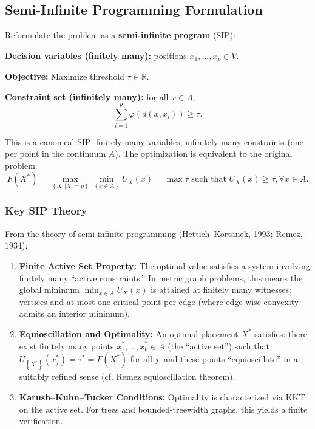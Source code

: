 \documentclass[
]{article}
\begin{document}
\subsection{Semi-Infinite Programming Formulation}

Reformulate the problem as a \textbf{semi-infinite program} (SIP):

\textbf{Decision variables (finitely many):} positions
\(x_{1},\ldots,x_{p} \in V\).

\textbf{Objective:} Maximize threshold \(\tau \in {\mathbb{R}}\).

\textbf{Constraint set (infinitely many):} for all \(x \in A\),
\[\sum_{i = 1}^{p}\varphi(d\left( x,x_{i} \right)) \geq \tau.\]

This is a canonical SIP: finitely many variables, infinitely many
constraints (one per point in the continuum \(A\)). The optimization is
equivalent to the original problem:
\[F\left( X^{*} \right) = \max_{\left\{ X,|X| = p \right\}}\min_{\left\{ x \in A \right\}}U_{X}(x) = \max\tau\text{ such that }U_{X}(x) \geq \tau,\forall x \in A.\]

\subsubsection{Key SIP Theory}

From the theory of semi-infinite programming (Hettich--Kortanek, 1993;
Remez, 1934):

\begin{enumerate}
\item
  \textbf{Finite Active Set Property:} The optimal value satisfies a
  system involving finitely many ``active constraints.'' In metric graph
  problems, this means the global minimum \(\min_{x \in A}U_{X}(x)\) is
  attained at finitely many witnesses: vertices and at most one critical
  point per edge (where edge-wise convexity admits an interior minimum).
\item
  \textbf{Equioscillation and Optimality:} An optimal placement
  \(X^{*}\) satisfies: there exist finitely many points
  \(x_{1}^{*},\ldots,x_{k}^{*} \in A\) (the ``active set'') such that
  \(U_{\left\{ X^{*} \right\}}\left( x_{j}^{*} \right) = \tau^{*} = F\left( X^{*} \right)\)
  for all \(j\), and these points ``equioscillate'' in a suitably
  refined sense (cf. Remez equioscillation theorem).
\item
  \textbf{Karush--Kuhn--Tucker Conditions:} Optimality is characterized
  via KKT on the active set. For trees and bounded-treewidth graphs,
  this yields a finite verification.
\end{enumerate}
\end{document}
